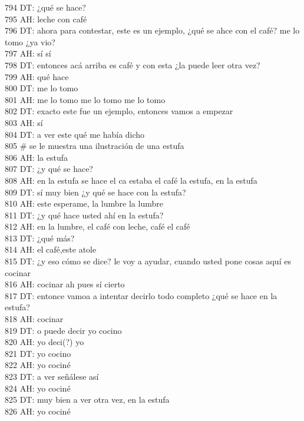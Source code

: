 794 DT: ¿qué se hace?\\
795 AH: leche con café\\
796 DT: ahora para contestar, este es un ejemplo, ¿qué se ahce con el café? me lo tomo ¿ya vio?\\
797 AH: sí sí\\
798 DT: entonces acá arriba es café y con esta ¿la puede leer otra vez?\\
799 AH: qué hace\\
800 DT: me lo tomo\\
801 AH: me lo tomo me lo tomo me lo tomo\\
802 DT: exacto este fue un ejemplo, entonces vamos a empezar\\
803 AH: sí\\
804 DT: a ver este qué me había dicho\\
805 # se le muestra una ilustración de una estufa\\
806 AH: la estufa\\
807 DT: ¿y qué se hace?\\
808 AH: en la estufa se hace el ca estaba el café la estufa, en la estufa\\
809 DT: sí muy bien ¿y qué se hace con la estufa?\\
810 AH: este esperame, la lumbre la lumbre\\
811 DT: ¿y qué hace usted ahí en la estufa?\\
812 AH: en la lumbre, el café con leche, café el café\\
813 DT: ¿qué más?\\
814 AH: el café,este atole\\
815 DT: ¿y eso cómo se dice? le voy a ayudar, cuando usted pone cosas aquí es cocinar\\
816 AH: cocinar ah pues sí cierto\\
817 DT: entonce vamoa a intentar decirlo todo completo ¿qué se hace en la estufa?\\
818 AH: cocinar\\
819 DT: o puede decir yo cocino\\
820 AH: yo deci(?) yo\\
821 DT: yo cocino\\
822 AH: yo cociné\\
823 DT: a ver señálese así\\
824 AH: yo cociné\\
825 DT: muy bien a ver otra vez, en la estufa\\
826 AH: yo cociné \\
